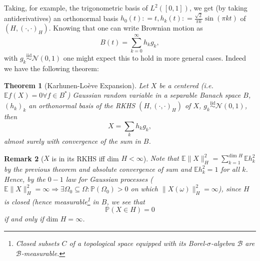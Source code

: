 \documentclass[11pt,reqno]{amsart}
\numberwithin{equation}{section}
\newtheorem{thm}{Theorem}[section]
\newtheorem{rem}[thm]{Remark}
\newcommand{\deq}{\mathrel{\mathop:}=}
\newcommand{\iidnormal}{\mathrel{\stackrel{\text{iid}}{\sim}}\mathcal N(0,1)}
\begin{document}
Taking, for example, the trigonometric basis of $L^2([0,1])$, we get (by taking antiderivatives) an orthonormal basis $h_0(t)\deq t, h_k(t)\deq \frac{\sqrt 2}{\pi k}\sin(\pi kt)$ of $(H,(\cdot,\cdot)_H)$. Knowing that one can write Brownian motion as $$B(t)=\sum_{k=0}^\infty h_kg_k,$$ with $g_k\iidnormal$ one might expect this to hold in more general cases.
Indeed we have the following theorem:

\begin{thm}[Karhunen-Lo\`eve Expansion]
	Let $X$ be a centered (i.e. $\mathbb E f(X)=0 \forall f\in B^*$) Gaussian random variable in a separable Banach space $B$, $(h_k)_k$ an orthonormal basis of the RKHS $(H,(\cdot,\cdot)_H)$ of $X$, $g_k\iidnormal$, then
	$$X=\sum_k h_kg_k,$$
	almost surely with convergence of the sum in $B$.
\end{thm}

\begin{rem}[$X$ is in its RKHS iff dim $H<\infty$]\label{rem:XnotinRKHS}
	Note that $\mathbb E\|X\|_H^2 = \sum_{k=1}^{\text{dim }H}\mathbb E h_k^2$ by the previous theorem and absolute convergence of sum and $\mathbb E h_k^2 = 1$ for all $k$. Hence, by the $0-1$ law for Gaussian processes ($\mathbb E\|X\|_H^2=\infty \Rightarrow \exists\Omega_0\subseteq\Omega: \mathbb P(\Omega_0)>0$ on which $\|X(\omega)\|_H^2=\infty$), since $H$ is closed (hence measurable\footnote{Closed subsets $C$ of a topological space equipped with its Borel-$\sigma$-algebra $\mathcal B$ are $\mathcal B$-measurable.} in $B$, we see that $$\mathbb P(X\in H)=0$$
	if and only if $\text{dim }H=\infty$.
\end{rem}
\end{document}
